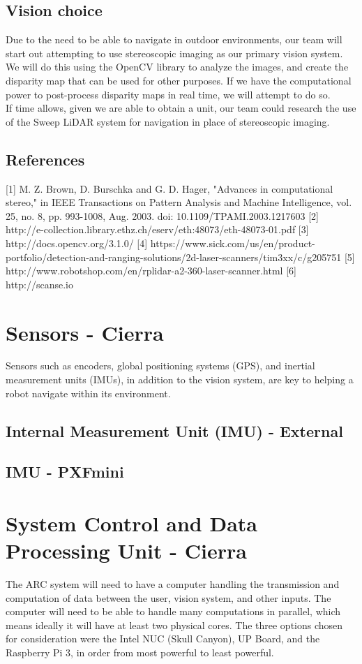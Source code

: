 \documentclass[compsoc,draftclsnofoot,onecolumn,10pt]{IEEEtran}
\begin{document}
\subsection{Vision choice}
Due to the need to be able to navigate in outdoor environments, our team will start out attempting to use stereoscopic imaging as our primary vision system. We will do this using the OpenCV library to analyze the images, and create the disparity map that can be used for other purposes. If we have the computational power to post-process disparity maps in real time, we will attempt to do so. \\
If time allows, given we are able to obtain a unit, our team could research the use of the Sweep LiDAR system for navigation in place of stereoscopic imaging. 

\subsection{References}
[1] M. Z. Brown, D. Burschka and G. D. Hager, "Advances in computational stereo," in IEEE Transactions on Pattern Analysis and Machine Intelligence, vol. 25, no. 8, pp. 993-1008, Aug. 2003. doi: 10.1109/TPAMI.2003.1217603
[2] http://e-collection.library.ethz.ch/eserv/eth:48073/eth-48073-01.pdf
[3] http://docs.opencv.org/3.1.0/
[4] https://www.sick.com/us/en/product-portfolio/detection-and-ranging-solutions/2d-laser-scanners/tim3xx/c/g205751
[5] http://www.robotshop.com/en/rplidar-a2-360-laser-scanner.html
[6] http://scanse.io

\section{Sensors - Cierra}
Sensors such as encoders, global positioning systems (GPS), and inertial measurement units (IMUs), in addition to the vision system, are key to helping a robot navigate within its environment. 

\subsection{Internal Measurement Unit (IMU) - External}
\subsection{IMU - PXFmini}


\section{System Control and Data Processing Unit - Cierra}
The ARC system will need to have a computer handling the transmission and computation of data between the user, vision system, and other inputs. 
The computer will need to be able to handle many computations in parallel, which means ideally it will have at least two physical cores. 
The three options chosen for consideration were the Intel NUC (Skull Canyon), UP Board, and the Raspberry Pi 3, in order from most powerful to least powerful. 
\end{document}
